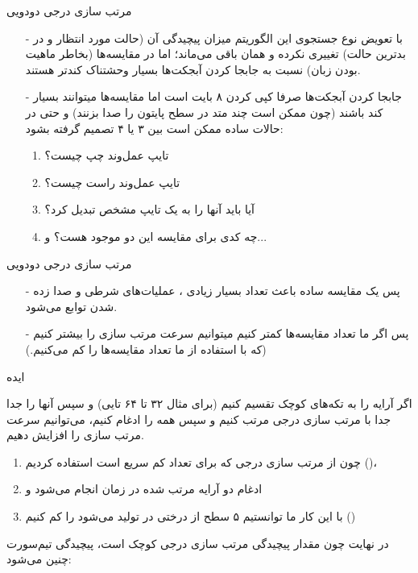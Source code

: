 \begin{frame}{مرتب‌ سازی درجی دودویی}
\begin{itemize}\itemr
\item[-]
با تعویض نوع جستجوی‌ این الگوریتم میزان پیچیدگی آن (حالت مورد انتظار و در بدترین حالت) تغییری نکرده و همان
باقی می‌ماند؛ اما در 
مقایسه‌ها (بخاطر ماهیت  بودن زبان) نسبت به جابجا کردن آبجکت‌ها بسیار وحشتناک کند‌تر هستند.
\item[-]
جابجا کردن آبجکت‌ها صرفا کپی کردن ۸ بایت  است اما مقایسه‌ها میتوانند بسیار کند باشند (چون ممکن است چند متد در سطح پایتون را صدا بزنند) و حتی در حالات ساده ممکن است بین ۳ یا ۴ تصمیم گرفته بشود: 

\begin{enumerate}\itemr
\item 
تایپ عمل‌وند چپ چیست؟
\item 
تایپ عمل‌وند راست چیست؟
\item 
آیا باید آنها را به یک تایپ مشخص تبدیل کرد؟
\item 
چه کدی برای مقایسه این دو موجود هست؟ و...
\end{enumerate}
\end{itemize}
\end{frame}

\begin{frame}{مرتب سازی درجی دودویی}
\begin{itemize}\itemr
\item[-]
پس یک مقایسه ساده باعث تعداد بسیار زیادی ، عملیات‌های شرطی و صدا زده شدن توابع می‌شود.

\item[-]
پس اگر ما تعداد مقایسه‌ها کمتر کنیم میتوانیم سرعت مرتب سازی را بیشتر کنیم (که با استفاده از  ما تعداد مقایسه‌ها را کم می‌کنیم.)
\end{itemize}
\end{frame}

\begin{frame}{ایده}
\begin{center}
{\large اگر آرایه را به تکه‌های کوچک تقسیم کنیم‌ (برای مثال ۳۲ تا ۶۴ تایی) و سپس آنها را جدا جدا با مرتب‌ سازی درجی مرتب کنیم و سپس همه را ادغام کنیم، می‌توانیم سرعت مرتب سازی را افزایش دهیم.}
\end{center}

\begin{enumerate}\itemr
\item
چون از مرتب سازی درجی که برای تعداد کم سریع است استفاده کردیم ()،
\item
ادغام دو آرایه مرتب شده در زمان 
انجام می‌شود و

\item 
با این کار ما توانستیم ۵ سطح از درختی در  تولید می‌شود را کم کنیم ()
\end{enumerate}

\begin{center}
{\large در نهایت چون مقدار پیچیدگی مرتب سازی درجی کوچک است، پیچیدگی  تیم‌سورت چنین می‌شود: }
\end{center}
\end{frame}

